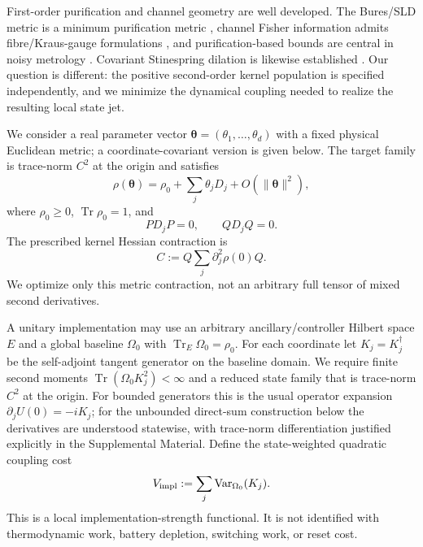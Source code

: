 \documentclass[aps,pra,preprint,nofootinbib]{revtex4-2}
\newcommand{\Tr}{\operatorname{Tr}}
\newcommand{\Var}{\operatorname{Var}}
\newcommand{\rhozero}{\rho_0}
\newcommand{\Omegazero}{\Omega_0}
\newcommand{\Vimpl}{V_{\rm impl}}
\newcommand{\Cker}{C}
\begin{document}
First-order purification and channel geometry are well developed. The Bures/SLD metric is a minimum purification metric \cite{BraunsteinCaves1994}, channel Fisher information admits fibre/Kraus-gauge formulations \cite{FujiwaraImai2008}, and purification-based bounds are central in noisy metrology \cite{EscherEtAl2011,DemkowiczKolodynskiGuta2012}. Covariant Stinespring dilation is likewise established \cite{Scutaru1979}. Our question is different: the positive second-order kernel population is specified independently, and we minimize the dynamical coupling needed to realize the resulting local state jet.

We consider a real parameter vector $\bm\theta=(\theta_1,\ldots,\theta_d)$ with a fixed physical Euclidean metric; a coordinate-covariant version is given below. The target family is trace-norm $C^2$ at the origin and satisfies
\begin{equation}
 \rho(\bm\theta)=\rhozero+\sum_j \theta_j D_j+O(\|\bm\theta\|^2),
\end{equation}
where $\rhozero\ge0$, $\Tr\rhozero=1$, and
\begin{equation}
 P D_jP=0,\qquad QD_jQ=0.
 \label{eq:pureboundary}
\end{equation}
The prescribed kernel Hessian contraction is
\begin{equation}
 \Cker:=Q\sum_j \partial_j^2\rho(0)Q.
 \label{eq:Cdef}
\end{equation}
We optimize only this metric contraction, not an arbitrary full tensor of mixed second derivatives.

A unitary implementation may use an arbitrary ancillary/controller Hilbert space $E$ and a global baseline $\Omegazero$ with $\Tr_E\Omegazero=\rhozero$. For each coordinate let $K_j=K_j^\dagger$ be the self-adjoint tangent generator on the baseline domain. We require finite second moments $\Tr(\Omegazero K_j^2)<\infty$ and a reduced state family that is trace-norm $C^2$ at the origin. For bounded generators this is the usual operator expansion $\partial_jU(0)=-iK_j$; for the unbounded direct-sum construction below the derivatives are understood statewise, with trace-norm differentiation justified explicitly in the Supplemental Material. Define the state-weighted quadratic coupling cost
\begin{equation}
 \Vimpl:=\sum_j \Var_{\Omegazero}(K_j).
 \label{eq:Vdef}
\end{equation}
This is a local implementation-strength functional. It is not identified with thermodynamic work, battery depletion, switching work, or reset cost.
\end{document}
